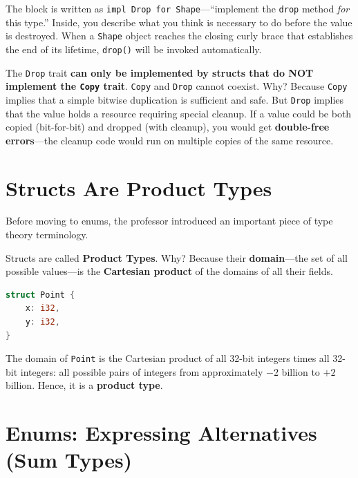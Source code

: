 The block is written as \texttt{impl Drop for Shape}---``implement the \texttt{drop} method \textit{for} this type.'' Inside, you describe what you think is necessary to do before the value is destroyed. When a \texttt{Shape} object reaches the closing curly brace that establishes the end of its lifetime, \texttt{drop()} will be invoked automatically.

\begin{warningbox}
The \texttt{Drop} trait \textbf{can only be implemented by structs that do NOT implement the \texttt{Copy} trait}. \texttt{Copy} and \texttt{Drop} cannot coexist. Why? Because \texttt{Copy} implies that a simple bitwise duplication is sufficient and safe. But \texttt{Drop} implies that the value holds a resource requiring special cleanup. If a value could be both copied (bit-for-bit) and dropped (with cleanup), you would get \textbf{double-free errors}---the cleanup code would run on multiple copies of the same resource.
\end{warningbox}

\section{Structs Are Product Types}

Before moving to enums, the professor introduced an important piece of type theory terminology.

Structs are called \textbf{Product Types}. Why? Because their \textbf{domain}---the set of all possible values---is the \textbf{Cartesian product} of the domains of all their fields.

\begin{lstlisting}[language=Rust]
struct Point {
    x: i32,
    y: i32,
}
\end{lstlisting}

The domain of \texttt{Point} is the Cartesian product of all 32-bit integers times all 32-bit integers: all possible pairs of integers from approximately $-2$ billion to $+2$ billion. Hence, it is a \textbf{product type}.

\section{Enums: Expressing Alternatives (Sum Types)}

